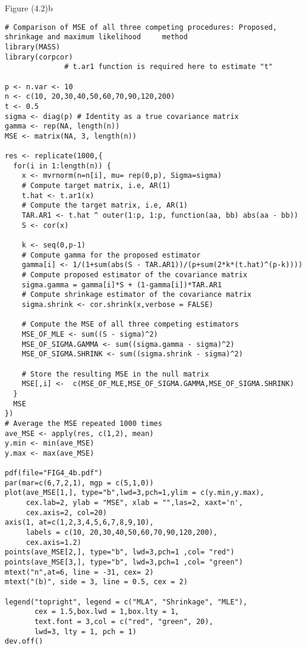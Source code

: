 Figure (4.2)b
\begin{lstlisting}
# Comparison of MSE of all three competing procedures: Proposed, shrinkage and maximum likelihood     method 
library(MASS)
library(corpcor)
              # t.ar1 function is required here to estimate "t"

p <- n.var <- 10
n <- c(10, 20,30,40,50,60,70,90,120,200)
t <- 0.5
sigma <- diag(p) # Identity as a true covariance matrix
gamma <- rep(NA, length(n))
MSE <- matrix(NA, 3, length(n))

res <- replicate(1000,{
  for(i in 1:length(n)) {
    x <- mvrnorm(n=n[i], mu= rep(0,p), Sigma=sigma)
    # Compute target matrix, i.e, AR(1)
    t.hat <- t.ar1(x)
    # Compute the target matrix, i.e, AR(1)
    TAR.AR1 <- t.hat ^ outer(1:p, 1:p, function(aa, bb) abs(aa - bb))
    S <- cor(x)
    
    k <- seq(0,p-1)
    # Compute gamma for the proposed estimator
    gamma[i] <- 1/(1+sum(abs(S - TAR.AR1))/(p+sum(2*k*(t.hat)^(p-k))))
    # Compute proposed estimator of the covariance matrix
    sigma.gamma = gamma[i]*S + (1-gamma[i])*TAR.AR1
    # Compute shrinkage estimator of the covariance matrix
    sigma.shrink <- cor.shrink(x,verbose = FALSE)
    
    # Compute the MSE of all three competing estimators
    MSE_OF_MLE <- sum((S - sigma)^2)
    MSE_OF_SIGMA.GAMMA <- sum((sigma.gamma - sigma)^2)
    MSE_OF_SIGMA.SHRINK <- sum((sigma.shrink - sigma)^2)
    
    # Store the resulting MSE in the null matrix
    MSE[,i] <-  c(MSE_OF_MLE,MSE_OF_SIGMA.GAMMA,MSE_OF_SIGMA.SHRINK)
  }
  MSE
})
# Average the MSE repeated 1000 times
ave_MSE <- apply(res, c(1,2), mean)
y.min <- min(ave_MSE)
y.max <- max(ave_MSE)

pdf(file="FIG4_4b.pdf")
par(mar=c(6,7,2,1), mgp = c(5,1,0))
plot(ave_MSE[1,], type="b",lwd=3,pch=1,ylim = c(y.min,y.max),
     cex.lab=2, ylab = "MSE", xlab = "",las=2, xaxt='n',
     cex.axis=2, col=20)
axis(1, at=c(1,2,3,4,5,6,7,8,9,10),
     labels = c(10, 20,30,40,50,60,70,90,120,200),
     cex.axis=1.2)
points(ave_MSE[2,], type="b", lwd=3,pch=1 ,col= "red")
points(ave_MSE[3,], type="b", lwd=3,pch=1 ,col= "green")
mtext("n",at=6, line = -31, cex= 2)
mtext("(b)", side = 3, line = 0.5, cex = 2)

legend("topright", legend = c("MLA", "Shrinkage", "MLE"),
       cex = 1.5,box.lwd = 1,box.lty = 1,
       text.font = 3,col = c("red", "green", 20),
       lwd=3, lty = 1, pch = 1)
dev.off()
\end{lstlisting}

